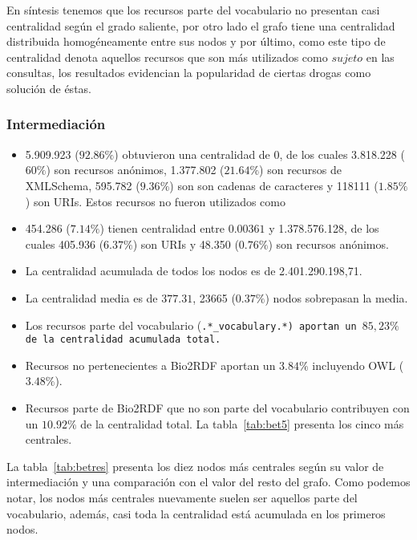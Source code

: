 En síntesis tenemos que los recursos parte del vocabulario no presentan casi
centralidad según el grado saliente, por otro lado el grafo tiene una
centralidad distribuida homogéneamente entre sus nodos y por último, como este
tipo de centralidad denota aquellos recursos que son más utilizados como
$sujeto$ en las consultas, los resultados evidencian la popularidad de ciertas
drogas como solución de éstas.

\subsubsection{Intermediación}
\begin{itemize}
  \item 5.909.923 ($92.86\%$) obtuvieron una centralidad de 0, de los cuales
      3.818.228 ($60\%$) son recursos anónimos,
      1.377.802 ($21.64\%$) son recursos de XMLSchema,
      595.782 ($9.36\%$) son son cadenas de caracteres y
      118111 ($1.85\%$) son URIs.
      Estos recursos no fueron utilizados como 
  \item
    454.286 ($7.14\%$) tienen centralidad entre $0.00361$ y 1.378.576.128, de
    los cuales 405.936 ($6.37\%$) son URIs y
    48.350 ($0.76\%$) son recursos anónimos.
  \item La centralidad acumulada de todos los nodos es de 2.401.290.198,71.
  \item
    La centralidad media es de $377.31$, 23665 ($0.37\%$) nodos sobrepasan
    la media.
  \item 
    Los recursos parte del vocabulario (\tt{.*\_vocabulary.*}) aportan un 
    $85,23\%$ de la centralidad acumulada total.
  \item
    Recursos no pertenecientes a Bio2RDF aportan un $3.84\%$ incluyendo OWL 
    ($3.48\%$).
  \item 
    Recursos parte de Bio2RDF que no son parte del vocabulario contribuyen con
    un $10.92\%$ de la centralidad total. La tabla~\ref{tab:bet5} presenta los
    cinco más centrales.
\end{itemize}

La tabla~\ref{tab:betres} presenta los diez nodos más centrales según su valor
de intermediación y una comparación con el valor del resto del grafo.
Como podemos notar, los nodos más centrales nuevamente suelen ser aquellos parte
del vocabulario, además, casi toda la centralidad está acumulada en los primeros
nodos.

